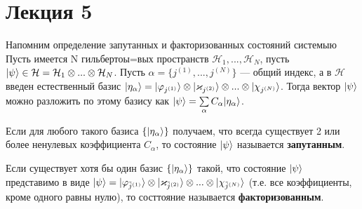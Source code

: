 \section{Лекция 5}
Напомним определение запутанных и факторизованных состояний системыю Пусть имеется N гильбертоы=вых пространств $\mathcal{H}_1, ..., \mathcal{H}_N$, пусть $| \psi \rangle \in \mathcal{H} = \mathcal{H}_1\otimes ...\otimes\mathcal{H}_N$. Пусть $\alpha = \{j^{(1)}, ..., j^{(N)}\}$ --- общий индекс, а в $\mathcal{H}$ введен естественный базис $| \eta_\alpha \rangle = | \varphi_{j^{(1)}} \rangle\otimes| \varkappa_{j^{(2)}} \rangle\otimes...\otimes| \chi_{j^{(N)}} \rangle$. Тогда вектор $| \psi \rangle$ можно разложить по этому базису как $| \psi \rangle = \sum\limits_\alpha C_\alpha | \eta_\alpha \rangle$.\\

\begin{definition}
	Если для любого такого базиса $\{| \eta_\alpha \rangle\}$ получаем, что всегда существует 2 или более ненулевых коэффициента $C_\alpha$, то состояние $| \psi \rangle$ называется \textbf{запутанным}.
\end{definition}
\begin{definition}
	Если существует хотя бы один базис $\{| \eta_\alpha \rangle\}$ такой, что состояние $| \psi \rangle$ представимо в виде $| \psi \rangle = | \varphi_{\tilde{j}^{(1)}} \rangle\otimes| \varkappa_{\tilde{j}^{(2)}} \rangle\otimes...\otimes| \chi_{\tilde{j}^{(N)}} \rangle$ (т.е. все коэффициенты, кроме одного равны нулю), то состтояние называется \textbf{факторизованным}.
\end{definition}

